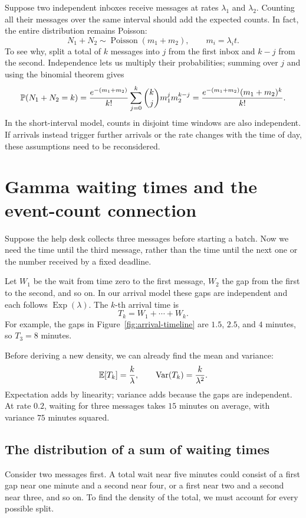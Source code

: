 Suppose two independent inboxes receive messages at rates \(\lambda_1\)
and \(\lambda_2\). Counting all their messages over the same interval
should add the expected counts. In fact, the entire distribution remains
Poisson:
\[
  N_1+N_2\sim\operatorname{Poisson}(m_1+m_2),
  \qquad m_i=\lambda_i t.
\]
To see why, split a total of \(k\) messages into \(j\) from the first inbox
and \(k-j\) from the second. Independence lets us multiply their
probabilities; summing over \(j\) and using the binomial theorem gives
\[
  \mathbb{P}(N_1+N_2=k)
  =\frac{e^{-(m_1+m_2)}}{k!}
    \sum_{j=0}^k\binom kj m_1^j m_2^{k-j}
  =\frac{e^{-(m_1+m_2)}(m_1+m_2)^k}{k!}.
\]
In the short-interval model, counts in disjoint time windows are also
independent. If arrivals instead trigger further arrivals or the rate
changes with the time of day, these assumptions need to be reconsidered.

\section{Gamma waiting times and the event-count connection}
\label{sec:gamma}

Suppose the help desk collects three messages before starting a batch.
Now we need the time until the third message, rather than the time until
the next one or the number received by a fixed deadline.

Let \(W_1\) be the wait from time zero to the first message, \(W_2\) the
gap from the first to the second, and so on. In our arrival model these
gaps are independent and each follows \(\operatorname{Exp}(\lambda)\).
The \(k\)-th arrival time is
\[
  T_k=W_1+\cdots+W_k.
\]
For example, the gaps in Figure~\ref{fig:arrival-timeline} are \(1.5\),
\(2.5\), and \(4\) minutes, so \(T_3=8\) minutes.

Before deriving a new density, we can already find the mean and variance:
\[
  \mathbb{E}[T_k]=\frac{k}{\lambda},\qquad
  \operatorname{Var}(T_k)=\frac{k}{\lambda^2}.
\]
Expectation adds by linearity; variance adds because the gaps are
independent. At rate \(0.2\), waiting for three messages takes \(15\)
minutes on average, with variance \(75\) minutes squared.

\subsection{The distribution of a sum of waiting times}

Consider two messages first. A total wait near five minutes could consist
of a first gap near one minute and a second near four, or a first near
two and a second near three, and so on. To find the density of the total,
we must account for every possible split.

